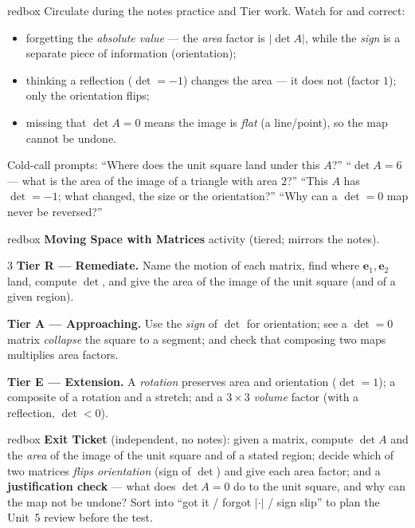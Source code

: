 \documentclass[10pt]{article}
\newcommand{\ee}{\mathbf{e}}
\begin{document}
\begin{skillbox}{redbox}
Circulate during the notes practice and Tier work. Watch for and correct:
\begin{itemize}[leftmargin=1.2em, nosep]
  \item forgetting the \emph{absolute value} --- the \emph{area} factor is $|\det A|$, while the \emph{sign} is a separate piece of information (orientation);
  \item thinking a reflection ($\det=-1$) changes the area --- it does not (factor $1$); only the orientation flips;
  \item missing that $\det A=0$ means the image is \emph{flat} (a line/point), so the map cannot be undone.
\end{itemize}
Cold-call prompts: ``Where does the unit square land under this $A$?'' ``$\det A=6$ --- what is the area
of the image of a triangle with area $2$?'' ``This $A$ has $\det=-1$; what changed, the size or the
orientation?'' ``Why can a $\det=0$ map never be reversed?''
\end{skillbox}

\begin{skillbox}{redbox}
\textbf{Moving Space with Matrices} activity (tiered; mirrors the notes).
\begin{multicols}{3}
\textbf{Tier R --- Remediate.} Name the motion of each matrix, find where $\ee_1,\ee_2$ land, compute
$\det$, and give the area of the image of the unit square (and of a given region).

\columnbreak
\textbf{Tier A --- Approaching.} Use the \emph{sign} of $\det$ for orientation; see a $\det=0$ matrix
\emph{collapse} the square to a segment; and check that composing two maps multiplies area factors.

\columnbreak
\textbf{Tier E --- Extension.} A \emph{rotation} preserves area and orientation ($\det=1$); a composite
of a rotation and a stretch; and a $3\times3$ \emph{volume} factor (with a reflection, $\det<0$).
\end{multicols}
\end{skillbox}

\begin{skillbox}{redbox}
\textbf{Exit Ticket} (independent, no notes): given a matrix, compute $\det A$ and the \emph{area} of
the image of the unit square and of a stated region; decide which of two matrices \emph{flips
orientation} (sign of $\det$) and give each area factor; and a \textbf{justification check} --- what
does $\det A=0$ do to the unit square, and why can the map not be undone? Sort into ``got it / forgot
$|\cdot|$ / sign slip'' to plan the Unit~5 review before the test.
\end{skillbox}
\end{document}

